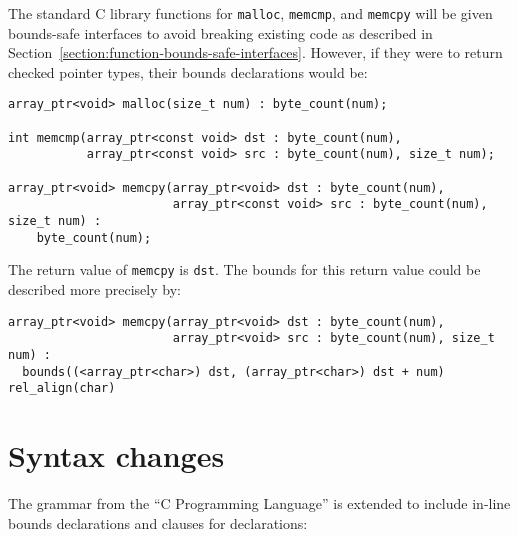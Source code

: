 The standard C library functions for \texttt{malloc}, \texttt{memcmp}, and
\texttt{memcpy} will be
given bounds-safe interfaces to avoid breaking existing code as
described in Section~\ref{section:function-bounds-safe-interfaces}. 
However, if they were to return checked pointer
types, their bounds declarations would be:

\begin{lstlisting}
array_ptr<void> malloc(size_t num) : byte_count(num);

int memcmp(array_ptr<const void> dst : byte_count(num),
           array_ptr<const void> src : byte_count(num), size_t num);

array_ptr<void> memcpy(array_ptr<void> dst : byte_count(num),
                       array_ptr<const void> src : byte_count(num), size_t num) :
    byte_count(num);
\end{lstlisting}

The return value of \texttt{memcpy} is \texttt{dst}. The bounds for
this return value could be described more precisely by:

\begin{lstlisting}
array_ptr<void> memcpy(array_ptr<void> dst : byte_count(num),
                       array_ptr<void> src : byte_count(num), size_t num) :
  bounds((<array_ptr<char>) dst, (array_ptr<char>) dst + num) rel_align(char)
\end{lstlisting}
\section{Syntax changes}
The grammar from the ``C Programming Language'' \cite{Ritchie1988} is extended to include
in-line bounds declarations and  clauses for declarations:

